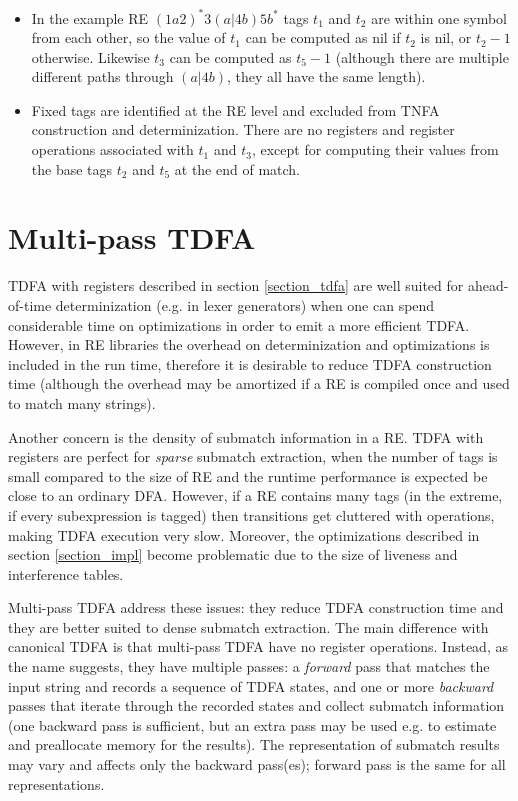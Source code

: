 \documentclass[]{article}
\begin{document}
\begin{itemize}

\item[\ding{212}]
In the example RE $(1a2)^*3(a|4b)5b^*$ tags $t_1$ and $t_2$ are within one symbol from each other,
so the value of $t_1$ can be computed as nil if $t_2$ is nil, or $t_2 - 1$ otherwise.
Likewise $t_3$ can be computed as $t_5 - 1$ (although there are multiple different paths through $(a|4b)$, they all have the same length).
\medskip

\item[\ding{212}]
Fixed tags are identified at the RE level and excluded from TNFA construction and determinization.
There are no registers and register operations associated with $t_1$ and $t_3$,
except for computing their values from the base tags $t_2$ and $t_5$ at the end of match.
\medskip

\end{itemize}

\FloatBarrier

\section{Multi-pass TDFA}\label{section_multipass}

TDFA with registers described in section \ref{section_tdfa}
are well suited for ahead-of-time determinization (e.g. in lexer generators)
when one can spend considerable time on optimizations in order to emit a more efficient TDFA.
However, in RE libraries the overhead on determinization and optimizations is included in the run time,
therefore it is desirable to reduce TDFA construction time
(although the overhead may be amortized if a RE is compiled once and used to match many strings).
\medskip

Another concern is the density of submatch information in a RE.
TDFA with registers are perfect for \emph{sparse} submatch extraction,
when the number of tags is small compared to the size of RE
and the runtime performance is expected be close to an ordinary DFA.
However, if a RE contains many tags (in the extreme, if every subexpression is tagged)
then transitions get cluttered with operations,
making TDFA execution very slow.
Moreover, the optimizations described in section \ref{section_impl} become problematic
due to the size of liveness and interference tables.
\medskip

Multi-pass TDFA address these issues:
they reduce TDFA construction time and they are better suited to dense submatch extraction.
The main difference with canonical TDFA is that multi-pass TDFA have no register operations.
Instead, as the name suggests, they have multiple passes:
a \emph{forward} pass that matches the input string and records a sequence of TDFA states,
and one or more \emph{backward} passes that iterate through the recorded states and collect submatch information
(one backward pass is sufficient, but an extra pass may be used e.g. to estimate and preallocate memory for the results).
The representation of submatch results may vary and affects only the backward pass(es);
forward pass is the same for all representations.
\medskip
\end{document}
